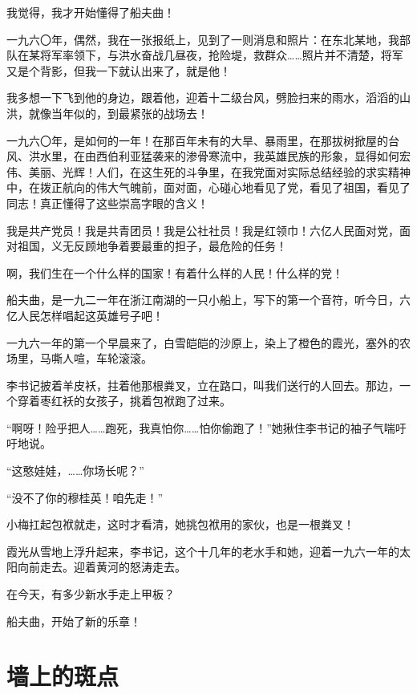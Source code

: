 \documentclass[12pt,UTF-8,openany]{ctexbook}
\begin{document}
\begin{normalsize}
    我觉得，我才开始懂得了船夫曲！
    
    一九六〇年，偶然，我在一张报纸上，见到了一则消息和照片：在东北某地，我部队在某将军率领下，与洪水奋战几昼夜，抢险堤，救群众……照片并不清楚，将军又是个背影，但我一下就认出来了，就是他！
    
    我多想一下飞到他的身边，跟着他，迎着十二级台风，劈脸扫来的雨水，滔滔的山洪，就像当年似的，到最紧张的战场去！
    
    一九六〇年，是如何的一年！在那百年未有的大旱、暴雨里，在那拔树掀屋的台风、洪水里，在由西伯利亚猛袭来的渗骨寒流中，我英雄民族的形象，显得如何宏伟、美丽、光辉！人们，在这生死的斗争里，在我党面对实际总结经验的求实精神中，在拨正航向的伟大气魄前，面对面，心碰心地看见了党，看见了祖国，看见了同志！真正懂得了这些崇高字眼的含义！
    
    我是共产党员！我是共青团员！我是公社社员！我是红领巾！六亿人民面对党，面对祖国，义无反顾地争着要最重的担子，最危险的任务！
    
    啊，我们生在一个什么样的国家！有着什么样的人民！什么样的党！
    
    船夫曲，是一九二一年在浙江南湖的一只小船上，写下的第一个音符，听今日，六亿人民怎样唱起这英雄号子吧！
    
    一九六一年的第一个早晨来了，白雪皑皑的沙原上，染上了橙色的霞光，塞外的农场里，马嘶人喧，车轮滚滚。
    
    李书记披着羊皮袄，拄着他那根粪叉，立在路口，叫我们送行的人回去。那边，一个穿着枣红袄的女孩子，挑着包袱跑了过来。
    
    “啊呀！险乎把人……跑死，我真怕你……怕你偷跑了！”她揪住李书记的袖子气喘吁吁地说。
    
    “这憨娃娃，……你场长呢？”
    
    “没不了你的穆桂英！咱先走！”
    
    小梅扛起包袱就走，这时才看清，她挑包袱用的家伙，也是一根粪叉！
    
    霞光从雪地上浮升起来，李书记，这个十几年的老水手和她，迎着一九六一年的太阳向前走去。迎着黄河的怒涛走去。
    
    在今天，有多少新水手走上甲板？
    
    船夫曲，开始了新的乐章！
    
\end{normalsize}



\chapter{墙上的斑点}
\end{document}
